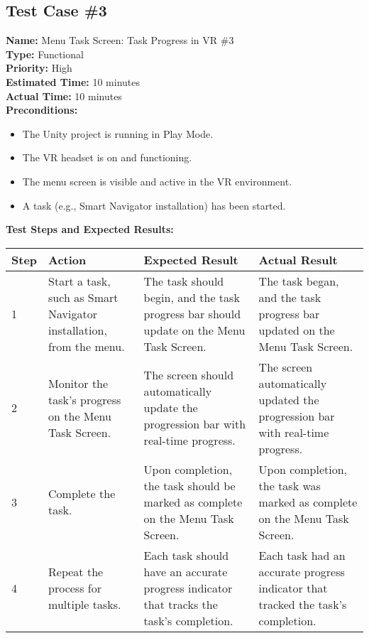 \documentclass[11pt]{article}
\begin{document}
\subsection{Test Case \#3}
\textbf{Name:} Menu Task Screen: Task Progress in VR \#3 \\
\textbf{Type:} Functional \\
\textbf{Priority:} High \\
\textbf{Estimated Time:} 10 minutes \\
\textbf{Actual Time:} 10 minutes \\
\textbf{Preconditions:} 
\begin{itemize}
    \item The Unity project is running in Play Mode.
    \item The VR headset is on and functioning.
    \item The menu screen is visible and active in the VR environment.
    \item A task (e.g., Smart Navigator installation) has been started.
\end{itemize}
\textbf{Test Steps and Expected Results:} \\
\begin{tabular}{@{} p{0.8cm} p{4.6cm} p{4.6cm} p{4.6cm} @{}}
\toprule
\textbf{Step} & \textbf{Action} & \textbf{Expected Result} & \textbf{Actual Result} \\
\midrule
1 & Start a task, such as Smart Navigator installation, from the menu. & The task should begin, and the task progress bar should update on the Menu Task Screen. & The task began, and the task progress bar updated on the Menu Task Screen. \\
2 & Monitor the task's progress on the Menu Task Screen. & The screen should automatically update the progression bar with real-time progress. & The screen automatically updated the progression bar with real-time progress. \\
3 & Complete the task. & Upon completion, the task should be marked as complete on the Menu Task Screen. & Upon completion, the task was marked as complete on the Menu Task Screen. \\
4 & Repeat the process for multiple tasks. & Each task should have an accurate progress indicator that tracks the task's completion. & Each task had an accurate progress indicator that tracked the task's completion. \\
\bottomrule
\end{tabular}
\end{document}
